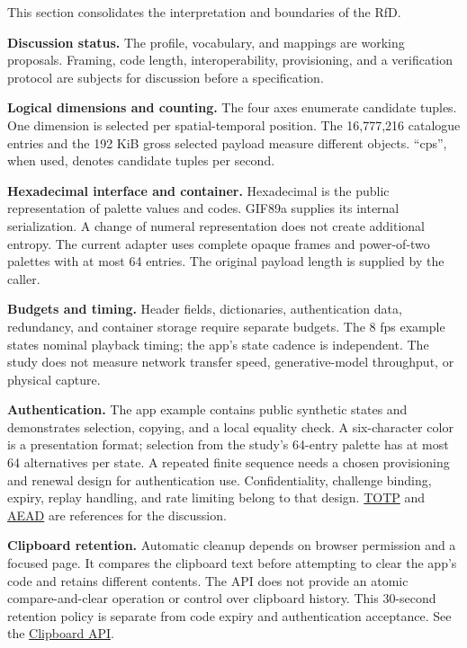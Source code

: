 \documentclass[
  11pt,
  a4paper,
]{article}
\begin{document}
This section consolidates the interpretation and boundaries of the RfD.

\textbf{Discussion status.} The profile, vocabulary, and mappings are
working proposals. Framing, code length, interoperability, provisioning,
and a verification protocol are subjects for discussion before a
specification.

\textbf{Logical dimensions and counting.} The four axes enumerate
candidate tuples. One dimension is selected per spatial-temporal
position. The 16,777,216 catalogue entries and the 192 KiB gross
selected payload measure different objects. ``cps'', when used, denotes
candidate tuples per second.

\textbf{Hexadecimal interface and container.} Hexadecimal is the public
representation of palette values and codes. GIF89a supplies its internal
serialization. A change of numeral representation does not create
additional entropy. The current adapter uses complete opaque frames and
power-of-two palettes with at most 64 entries. The original payload
length is supplied by the caller.

\textbf{Budgets and timing.} Header fields, dictionaries, authentication
data, redundancy, and container storage require separate budgets. The 8
fps example states nominal playback timing; the app's state cadence is
independent. The study does not measure network transfer speed,
generative-model throughput, or physical capture.

\textbf{Authentication.} The app example contains public synthetic
states and demonstrates selection, copying, and a local equality check.
A six-character color is a presentation format; selection from the
study's 64-entry palette has at most 64 alternatives per state. A
repeated finite sequence needs a chosen provisioning and renewal design
for authentication use. Confidentiality, challenge binding, expiry,
replay handling, and rate limiting belong to that design.
\href{https://www.rfc-editor.org/rfc/rfc6238.html}{TOTP} and
\href{https://www.rfc-editor.org/rfc/rfc5116.html}{AEAD} are references
for the discussion.

\textbf{Clipboard retention.} Automatic cleanup depends on browser
permission and a focused page. It compares the clipboard text before
attempting to clear the app's code and retains different contents. The
API does not provide an atomic compare-and-clear operation or control
over clipboard history. This 30-second retention policy is separate from
code expiry and authentication acceptance. See the
\href{https://www.w3.org/TR/clipboard-apis/}{Clipboard API}.
\end{document}
